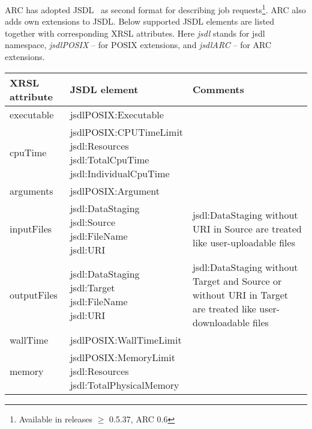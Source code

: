   	
  ARC has adopted JSDL~\cite{jsdl} as second format for describing job
  requests\footnote{Available in releases $\geq$ 0.5.37, ARC 0.6}. ARC also adds own extensions to JSDL. Below supported JSDL 
  elements are listed together with corresponding XRSL
  attributes. Here \textit{jsdl} stands for jsdl namespace,
  \textit{jsdlPOSIX} -- for POSIX extensions, and \textit{jsdlARC} --
  for ARC extensions.

\begin{longtable}{|l|l|p{5cm}|}
\hline 
\textbf{XRSL attribute} & \textbf{JSDL element} & \textbf{Comments} \\ \hline 
executable & jsdlPOSIX:Executable & \\ \hline 
cpuTime & \parbox[t]{5.5cm}{
    jsdlPOSIX:CPUTimeLimit \\
    jsdl:Resources \\
    \hspace*{0.5cm}jsdl:TotalCpuTime\\
    \hspace*{0.5cm}jsdl:IndividualCpuTime} & \\ \hline 
arguments & jsdlPOSIX:Argument & \\ \hline 
inputFiles &  \parbox[t]{5.5cm}{
    jsdl:DataStaging \\
    \hspace*{0.5cm}jsdl:Source \\
    \hspace*{1cm}jsdl:FileName \\
    \hspace*{1cm}jsdl:URI} &
    jsdl:DataStaging without URI in Source are treated like user-uploadable files \\ \hline
outputFiles & \parbox[t]{5.5cm}{
    jsdl:DataStaging \\
    \hspace*{0.5cm}jsdl:Target \\
    \hspace*{1cm}jsdl:FileName \\
    \hspace*{1cm}jsdl:URI} &
    jsdl:DataStaging without Target and Source or without URI in Target are treated like user-downloadable files \\ \hline 
wallTime & jsdlPOSIX:WallTimeLimit & \\ \hline 
memory &  \parbox[t]{5.5cm}{
    jsdlPOSIX:MemoryLimit \\
    jsdl:Resources \\
    \hspace*{0.5cm}jsdl:TotalPhysicalMemory \\
}
\end{longtable}
